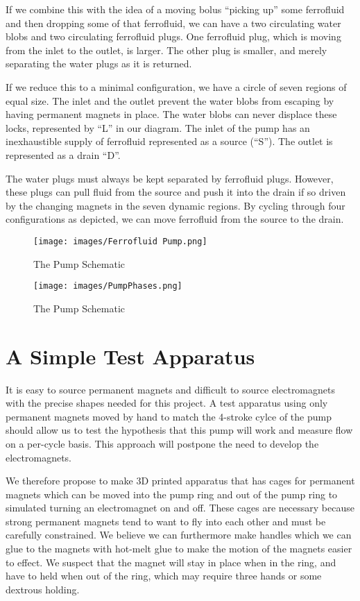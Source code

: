 \documentclass[12pt]{article}
\begin{document}
If we combine this with the idea of a moving bolus ``picking up'' some ferrofluid
and then dropping some of that ferrofluid, we can have a two circulating water blobs
and two circulating ferrofluid plugs. One ferrofluid plug, which is moving from the
inlet to the outlet, is larger.
The other plug is smaller, and merely separating the water plugs as it is returned.

If we reduce this to a minimal configuration, we have a circle of seven regions
of equal size. The inlet and the outlet prevent the water blobs from escaping by
having permanent magnets in place. The water blobs can never displace these
locks, represented by ``L'' in our diagram. The inlet of the pump has an
inexhaustible supply of ferrofluid represented as a source (``S''). The
outlet is represented as a drain ``D''.

The water plugs must always be kept separated by ferrofluid plugs. However,
these plugs can pull fluid from the source and push it into the drain if
so driven by the changing magnets in the seven dynamic regions.
By cycling through four configurations as depicted, we can move ferrofluid
from the source to the drain.




\begin{figure}
\centerline{\texttt{[image: images/Ferrofluid Pump.png]}}
\caption{The Pump Schematic}
\label{fig_pumpschematic}
\end{figure}

\begin{figure}
\centerline{\texttt{[image: images/PumpPhases.png]}}
\caption{The Pump Schematic}
\label{fig_pumpschematic}
\end{figure}

\section{A Simple Test Apparatus}

It is easy to source permanent magnets and difficult to source electromagnets with
the precise shapes needed for this project.
A test apparatus using only permanent magnets moved by hand to match the 4-stroke cylce
of the pump should allow us to test the hypothesis that this pump will work and measure
flow on a per-cycle basis.
This approach will postpone the need to develop the electromagnets.

We therefore propose to make 3D printed apparatus that has cages for permanent magnets
which can be moved into the pump ring and out of the pump ring to simulated turning
an electromagnet on and off.
These cages are necessary because strong permanent magnets tend to want to fly into
each other and must be carefully constrained.
We believe we can furthermore make handles which we can glue to the magnets with
hot-melt glue to make the motion of the magnets easier to effect.
We suspect that the magnet will stay in place when in the ring,
and have to held when out of the ring, which may require three hands or
some dextrous holding.
\end{document}

